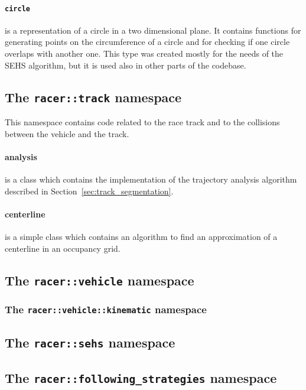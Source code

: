 \paragraph{\texttt{circle}} is a representation of a circle in a two dimensional plane. It contains functions for generating points on the circumference of a circle and for checking if one circle overlaps with another one. This type was created mostly for the needs of the \gls{SEHS} algorithm, but it is used also in other parts of the codebase.

\subsection{The \texttt{racer::track} namespace}

This namespace contains code related to the race track and to the collisions between the vehicle and the track.

\paragraph{analysis} is a class which contains the implementation of the trajectory analysis algorithm described in Section~\ref{sec:track_segmentation}.

\paragraph{centerline} is a simple class which contains an algorithm to find an approximation of a centerline in an occupancy grid.

\subsection{The \texttt{racer::vehicle} namespace}

\subsubsection{The \texttt{racer::vehicle::kinematic} namespace}

\subsection{The \texttt{racer::sehs} namespace}

\subsection{The \texttt{racer::following\_strategies} namespace}

